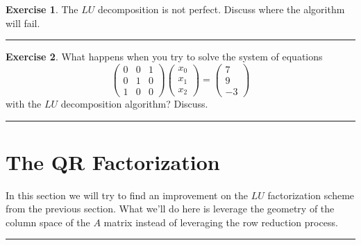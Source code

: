 \documentclass[
]{book}
\theoremstyle{definition}
\theoremstyle{definition}
\theoremstyle{definition}
\newtheorem{exercise}{Exercise}[chapter]
\theoremstyle{remark}
\begin{document}
\begin{exercise}
\protect\hypertarget{exr:unnamed-chunk-337}{}{\label{exr:unnamed-chunk-337} }The \(LU\) decomposition is not perfect. Discuss where the algorithm will fail.
\end{exercise}

\begin{center}\rule{0.5\linewidth}{0.5pt}\end{center}

\begin{exercise}
\protect\hypertarget{exr:unnamed-chunk-338}{}{\label{exr:unnamed-chunk-338} }What happens when you try to solve the system of equations
\[ \begin{pmatrix} 0 & 0 & 1 \\ 0 & 1 & 0 \\ 1 & 0 & 0 \end{pmatrix} \begin{pmatrix} x_0 \\ x_1 \\ x_2 \end{pmatrix} = \begin{pmatrix} 7 \\ 9\\-3\end{pmatrix} \]
with the \(LU\) decomposition algorithm? Discuss.
\end{exercise}

\begin{center}\rule{0.5\linewidth}{0.5pt}\end{center}

\hypertarget{the-qr-factorization}{%
\section{The QR Factorization}\label{the-qr-factorization}}

In this section we will try to find an improvement on the \(LU\) factorization scheme from the previous section. What we'll do here is leverage the geometry of the column space of the \(A\) matrix instead of leveraging the row reduction process.

\begin{center}\rule{0.5\linewidth}{0.5pt}\end{center}
\end{document}
